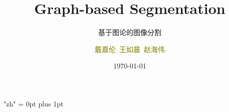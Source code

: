 \documentclass[notheorems,mathserif,table,compress]{beamer}  %
\begin{document}
\XeTeXlinebreaklocale "zh"         %
\XeTeXlinebreakskip = 0pt plus 1pt %

\title[Graph-based Segmentation]{Graph-based Segmentation}
\subtitle{基于图论的图像分割}
\author[戴嘉伦\ 王如晨\  赵海伟]{\textcolor{olive}{ 戴嘉伦\ 王如晨\ 赵海伟 }}
\institute[CVBIOUC]{\small\textcolor{violet}{CVBIOUC}}
\date{\today}
\frame{ \titlepage }

\end{document}
